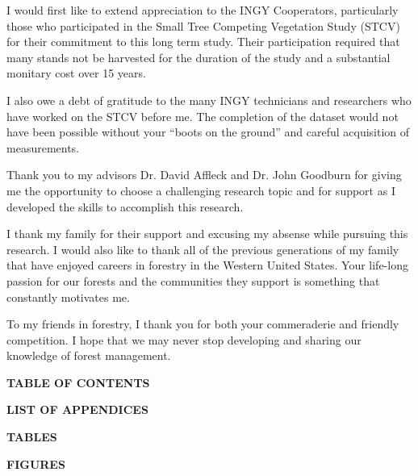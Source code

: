 \documentclass[11pt, letterpaper, fleqn]{article}
\begin{document}
I would first like to extend appreciation to the INGY Cooperators, particularly those who participated in the Small Tree Competing Vegetation Study (STCV) for their commitment to this long term study. Their participation required that many stands not be harvested for the duration of the study and a substantial monitary cost over 15 years.

I also owe a debt of gratitude to the many INGY technicians and researchers who have worked on the STCV before me. The completion of the dataset would not have been possible without your ``boots on the ground'' and careful acquisition of measurements.

Thank you to my advisors Dr. David Affleck and Dr. John Goodburn for giving me the opportunity to choose a challenging research topic and for support as I developed the skills to accomplish this research.

I thank my family for their support and excusing my absense while pursuing this research.  I would also like to thank all of the previous generations of my family that have enjoyed careers in forestry in the Western United States.  Your life-long passion for our forests and the communities they support is something that constantly motivates me.

To my friends in forestry, I thank you for both your commeraderie and friendly competition. I hope that we may never stop developing and sharing our knowledge of forest management. 






\newpage
\large 
\begin{center}
\textbf{TABLE OF CONTENTS}\\[1pt]
\end{center}

\normalsize
\tableofcontents
\large 
\begin{center}
\textbf{LIST OF APPENDICES}\\[1pt]
\end{center}
\listofappendices

\newpage
\large 
\begin{center}
\textbf{TABLES}\\[1pt]
\end{center}
\normalsize
\listoftables
\normalsize

\newpage
\large 
\begin{center}
\textbf{FIGURES}\\[1pt]
\end{center}
\normalsize
\listoffigures
\end{document}

